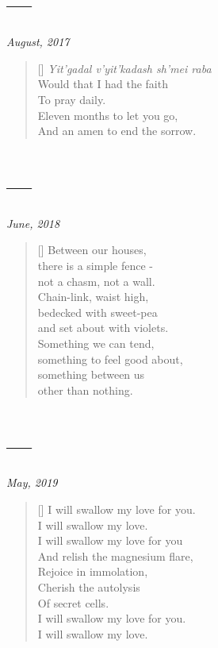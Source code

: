 \section{---}

\hfill\textit{August, 2017}

\begin{verse}[\textwidth]
\textit{Yit'gadal v'yit'kadash sh'mei raba}\\
Would that I had the faith\\
To pray daily.\\
Eleven months to let you go,\\
And an amen to end the sorrow.
\end{verse}
\newpage

\section{---}

\hfill\textit{June, 2018}

\begin{verse}[\textwidth]
  Between our houses,\\
  there is a simple fence -\\
  not a chasm, not a wall.\\
  Chain-link, waist high,\\
  bedecked with sweet-pea\\
  and set about with violets.\\
  Something we can tend,\\
  something to feel good about,\\
  something between us\\
  other than nothing.
\end{verse}
\newpage

\section{---}

\hfill\textit{May, 2019}

\begin{verse}[\textwidth]
    I will swallow my love for you.\\
    I will swallow my love.\\
    I will swallow my love for you\\
    And relish the magnesium flare,\\
    Rejoice in immolation,\\
    Cherish the autolysis\\
    Of secret cells.\\
    I will swallow my love for you.\\
    I will swallow my love.
\end{verse}
\newpage
